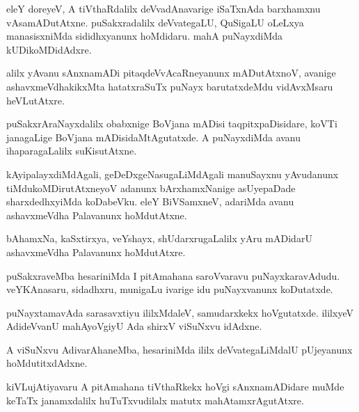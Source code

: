 \documentclass{article}
\begin{document}
\begin{mn}
eleY  doreyeV,  A  tiVthaRdalilx  deVvadAnavarige  iSaTxnAda  barxhamxnu  
vAsamADutAtxne.  puSakxradalilx  deVvategaLU,  QuSigaLU  oLeLxya  manasisxniMda  
sididhxyanunx  hoMdidaru.  mahA  puNayxdiMda  kUDikoMDidAdxre.
\end{mn}

\begin{mn}
alilx  yAvanu  sAnxnamADi  pitaqdeVvAcaRneyanunx  mADutAtxnoV,  avanige  
ashavxmeVdhakikxMta  hatatxraSuTx  puNayx  barutatxdeMdu  vidAvxMsaru  heVLutAtxre.
\end{mn}

\begin{mn}
puSakxrAraNayxdalilx  obabxnige  BoVjana mADisi  taqpitxpaDisidare,  koVTi janagaLige 
BoVjana mADisidaMtAgutatxde.  A  puNayxdiMda  avanu  ihaparagaLalilx  suKisutAtxne.
\end{mn}

\begin{mn}
kAyipalayxdiMdAgali,  geDeDxgeNasugaLiMdAgali  manuSayxnu  yAvudanunx  tiMdukoMDirutAtxneyoV  
adanunx  bArxhamxNanige  asUyepaDade  sharxdedhxyiMda  koDabeVku.  eleY  BiVSamxneV,  
adariMda  avanu  ashavxmeVdha  Palavanunx  hoMdutAtxne.
\end{mn}

\begin{mn}
bAhamxNa,  kaSxtirxya,  veYshayx,  shUdarxrugaLalilx  yAru  mADidarU  ashavxmeVdha  Palavanunx  hoMdutAtxre.
\end{mn}

\begin{mn}
puSakxraveMba  hesariniMda  I  pitAmahana  saroVvaravu  puNayxkaravAdudu.  veYKAnasaru,  
sidadhxru,  munigaLu  ivarige  idu  puNayxvanunx  koDutatxde.
\end{mn}

\begin{mn}
puNayxtamavAda  sarasavxtiyu  ililxMdaleV,  samudarxkekx  hoVgutatxde.  ililxyeV  
AdideVvanU  mahAyoVgiyU  Ada  shirxV viSuNxvu  idAdxne.
\end{mn}

\begin{mn}
A viSuNxvu  AdivarAhaneMba,  hesariniMda  ililx  deVvategaLiMdalU  pUjeyanunx  hoMdutitxdAdxne.
\end{mn}

\begin{mn}
kiVLujAtiyavaru  A  pitAmahana  tiVthaRkekx  hoVgi  sAnxnamADidare  muMde  
keTaTx janamxdalilx  huTuTxvudilalx  matutx  mahAtamxrAgutAtxre.
\end{mn}
\end{document}
